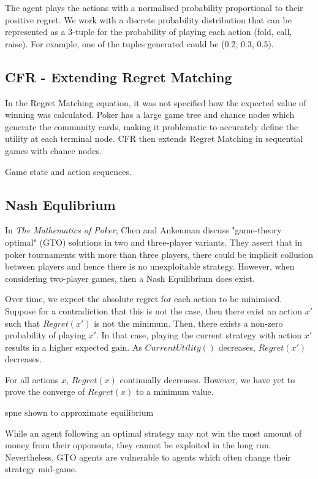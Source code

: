 \documentclass{article}
\begin{document}
The agent plays the actions with a normalised probability proportional to their positive regret. We work with a discrete probability distribution that can be represented as a 3-tuple for the probability of playing each action (fold, call, raise). For example, one of the tuples generated could be (0.2, 0.3, 0.5).

\subsection{CFR - Extending Regret Matching}

In the Regret Matching equation, it was not specified how the expected value of winning was calculated. Poker has a large game tree and chance nodes which generate the community cards, making it problematic to accurately define the utility at each terminal node. CFR then extends Regret Matching in sequential games with chance nodes.



Game state and action sequences.

\subsection{Nash Equlibrium}

In \textit{The Mathematics of Poker}, Chen and Ankenman discuss "game-theory optimal" (GTO) solutions in two and three-player variants. They assert that in poker tournaments with more than three players, there could be implicit collusion between players and hence there is no unexploitable strategy. However, when considering two-player games, then a Nash Equilibrium does exist. 

Over time, we expect the absolute regret for each action to be minimised. Suppose for a contradiction that this is not the case, then there exist an action $x'$ such that $Regret(x')$ is not the minimum. Then, there exists a non-zero probability of playing $x'$. In that case, playing the current strategy with action $x'$ results in a higher expected gain. As $CurrentUtility()$ decreases, $Regret(x')$ decreases.

For all actions $x$, $Regret(x)$ continually decreases. However, we have yet to prove the converge of $Regret(x)$ to a minimum value.

spne shown to approximate equilibrium

While an agent following an optimal strategy may not win the most amount of money from their opponents, they cannot be exploited in the long run. Nevertheless, GTO agents are vulnerable to agents which often change their strategy mid-game.
\end{document}
